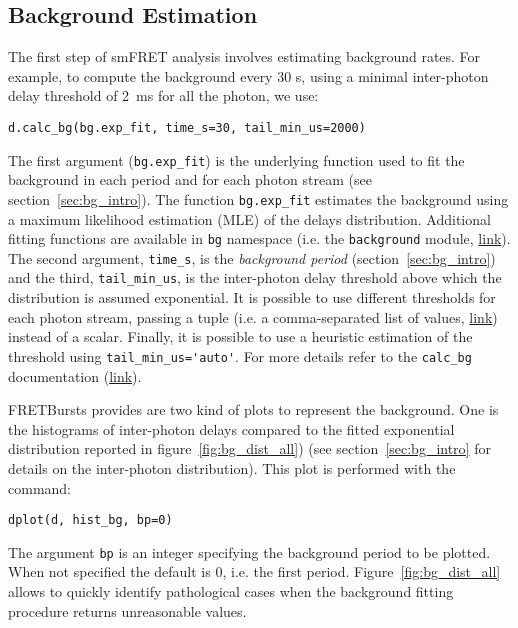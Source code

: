 \subsection{Background Estimation}
\label{sec:bg_calc}

The first step of smFRET analysis involves estimating background rates.
For example, to compute the background every 30 s, using a minimal inter-photon
delay threshold of 2~ms for all the photon, we use:

\begin{lstlisting}
d.calc_bg(bg.exp_fit, time_s=30, tail_min_us=2000)
\end{lstlisting}

The first argument (\verb|bg.exp_fit|) is the underlying function used to fit the
background in each period and for each photon stream (see section~\ref{sec:bg_intro}).
The function
\verb|bg.exp_fit| estimates the background using a maximum likelihood estimation
(MLE) of the delays distribution. Additional fitting functions are available in
\verb|bg| namespace 
(i.e. the \verb|background| module, \href{http://fretbursts.readthedocs.org/en/latest/background.html}
{link}). The second argument, \verb|time_s|, is the
\textit{background period} (section~\ref{sec:bg_intro}) and the third, \verb|tail_min_us|,
is the inter-photon delay threshold above which the distribution is assumed exponential.
It is possible to use different thresholds for each photon stream, passing a
tuple (i.e. a comma-separated list of values, \href{https://docs.python.org/3.5/tutorial/datastructures.html#tuples-and-sequences}{link}) instead of a scalar.
Finally, it is possible to use a heuristic estimation of the threshold using
\verb|tail_min_us='auto'|. For more details refer to the \verb|calc_bg| documentation
(\href{http://fretbursts.readthedocs.org/en/latest/data_class.html#fretbursts.burstlib.Data.calc_bg}{link}).

FRETBursts provides are two kind of plots to represent the background. One is the histograms
of inter-photon delays compared to the fitted exponential distribution reported in 
figure~\ref{fig:bg_dist_all}) (see section~\ref{sec:bg_intro} for details on the inter-photon distribution). 
This plot is performed with the command:

\begin{lstlisting}
dplot(d, hist_bg, bp=0)
\end{lstlisting}

The argument \verb|bp| is an integer specifying the background period to be plotted.
When not specified the default is 0, i.e. the first period.
Figure~\ref{fig:bg_dist_all} allows to quickly identify pathological cases when the 
background fitting procedure returns unreasonable values. 

